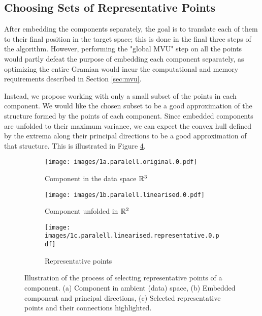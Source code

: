 \documentclass{article} %
\begin{document}
\subsection{Choosing Sets of Representative Points}\label{sec:representative-points}

After embedding the components separately, the goal is to translate each of them to their final position in the target space; this is done in the final three steps of the algorithm. However, performing the "global MVU" step on all the points would partly defeat the purpose of embedding each component separately, as optimizing the entire Gramian would incur the computational and memory requirements described in Section \ref{sec:mvu}.

Instead, we propose working with only a small subset of the points in each component. We would like the chosen subset to be a good approximation of the structure formed by the points of each component. Since embedded components are unfolded to their maximum variance, we can expect the convex hull defined by the extrema along their principal directions to be a good approximation of that structure. This is illustrated in Figure \ref{fig:representative-points}.

\begin{figure}[t]
  \centering
  \begin{subfigure}[b]{0.32\linewidth}
    \centering
    \texttt{[image: images/1a.paralell.original.0.pdf]}%
    \caption{Component in the data space $\mathbb{R}^3$}
    \label{fig:representative-points-orig}
  \end{subfigure}\hfill
  \begin{subfigure}[b]{0.32\linewidth}
    \centering
    \texttt{[image: images/1b.paralell.linearised.0.pdf]}%
    \caption{Component unfolded in $\mathbb{R}^2$}
    \label{fig:representative-points-embedded}
  \end{subfigure}\hfill
  \begin{subfigure}[b]{0.32\linewidth}
    \centering
    \texttt{[image: images/1c.paralell.linearised.representative.0.pdf]}%
    \caption{Representative points}
    \label{fig:representative-points-selected}
  \end{subfigure}
  \caption{Illustration of the process of selecting representative points of a component. (a) Component in ambient (data) space, (b) Embedded component and principal directions, (c) Selected representative points and their connections highlighted.}
  \label{fig:representative-points}
\end{figure}
\end{document}
